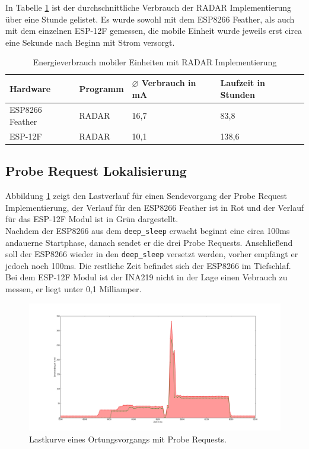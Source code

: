In Tabelle \ref{table:radarina} ist der durchschnittliche Verbrauch der RADAR Implementierung über eine Stunde gelistet.
Es wurde sowohl mit dem ESP8266 Feather, als auch mit dem einzelnen ESP-12F gemessen, die mobile Einheit wurde jeweils erst circa eine Sekunde nach Beginn mit Strom versorgt.

\begin{table}[h!]
	\centering
	\caption{Energieverbrauch mobiler Einheiten mit RADAR Implementierung}
	\label{table:radarina}
	\begin{tabular}{p{3.5cm}|p{5cm}|p{2.5cm}|p{2.5cm}}
		Hardware & Programm & $\varnothing$ Verbrauch in mA & Laufzeit in Stunden\\
		\hline
		ESP8266 Feather & RADAR & 16,7 & 83,8\\
		ESP-12F & RADAR & 10,1 & 138,6\\
	\end{tabular}
\end{table}

\subsection{Probe Request Lokalisierung}
\label{ch:phase2:sec:powerprobereq}
Abbildung \ref{fig:probereqv} zeigt den Lastverlauf für einen Sendevorgang der Probe Request Implementierung, der Verlauf für den ESP8266 Feather ist in Rot und der Verlauf für das ESP-12F Modul ist in Grün dargestellt.\\
Nachdem der ESP8266 aus dem \texttt{deep\_sleep} erwacht beginnt eine circa 100ms andauerne Startphase, danach sendet er die drei Probe Requests.
Anschließend soll der ESP8266 wieder in den \texttt{deep\_sleep} versetzt werden, vorher empfängt er jedoch noch 100ms.
Die restliche Zeit befindet sich der ESP8266 im Tiefschlaf. 
Bei dem ESP-12F Modul ist der INA219 nicht in der Lage einen Vebrauch zu messen, er liegt unter 0,1 Milliamper.\\

\begin{figure}[h!]
  \centering
	\includegraphics[width=\textwidth]{plots/probereqv.png}
  \caption{Lastkurve eines Ortungsvorgangs mit Probe Requests.}
  \label{fig:probereqv}
\end{figure}

